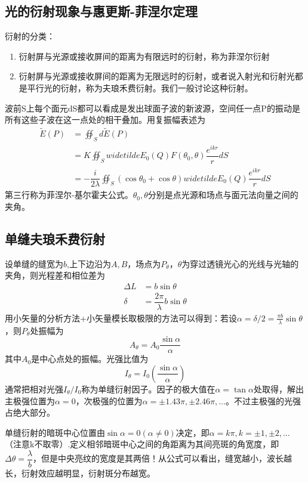 \subsection{光的衍射现象与惠更斯-菲涅尔定理}
衍射的分类：
\begin{enumerate}
    \item 衍射屏与光源或接收屏间的距离为有限远时的衍射，称为菲涅尔衍射
    \item 衍射屏与光源或接收屏间的距离为无限远时的衍射，或者说入射光和衍射光都是平行光的衍射，称为夫琅禾费衍射。我们一般讨论这种衍射。
\end{enumerate}
波前S上每个面元dS都可以看成是发出球面子波的新波源，空间任一点P的振动是所有这些子波在这一点处的相干叠加。用复振幅表述为
\begin{align}
    \widetilde{E}(P)&=\oiint _S d\widetilde{E}(P)\\
    &=K\oiint _S widetilde{E}_0(Q) F(\theta_0 ,\theta)\dfrac{e^{ikr}}{r}dS\\
    &=-\dfrac{i}{2\lambda}\oiint _S (\cos \theta_0 +\cos \theta)widetilde{E}_0(Q)\dfrac{e^{ikr}}{r}dS
\end{align}
第三行称为菲涅尔-基尔霍夫公式。$\theta_0,\theta$分别是点光源和场点与面元法向量之间的夹角。
\subsection{单缝夫琅禾费衍射}
设单缝的缝宽为$b$,上下边沿为$A,B$，场点为$P_\theta$，$\theta$为穿过透镜光心的光线与光轴的夹角，则光程差和相位差为
\begin{align}
    \Delta L &= b \sin \theta\\
    \delta &= \dfrac{2 \pi }{\lambda} b \sin \theta 
\end{align}
用小矢量的分析方法+小矢量模长取极限的方法可以得到：若设$\alpha = \delta /2=\frac{\pi b}{\lambda}\sin \theta$，则$P_\theta$处振幅为
\begin{equation}
    A_\theta=A_0 \dfrac{\sin \alpha}{\alpha}
\end{equation}
其中$A_0$是中心点处的振幅。光强比值为
\begin{equation}
    I_\theta  = I_0(\dfrac{\sin \alpha }{\alpha})
\end{equation}
通常把相对光强$I_\theta/I_0$称为单缝衍射因子。因子的极大值在$\alpha = \tan \alpha $处取得，解出主极强位置为$\alpha=0$，次极强的位置为$\alpha=\pm 1.43\pi,\pm 2.46\pi,\dots$。不过主极强的光强占绝大部分。

单缝衍射的暗斑中心位置由$\sin \alpha=0(\alpha\neq 0)$决定，即$\alpha=k\pi ,k=\pm 1,\pm 2,\dots$（注意k不取零）.定义相邻暗斑中心之间的角距离为其间亮斑的角宽度，即$\Delta \theta = \dfrac{\lambda}{b}$，但是中央亮纹的宽度是其两倍！从公式可以看出，缝宽越小，波长越长，衍射效应越明显，衍射斑分布越宽。
